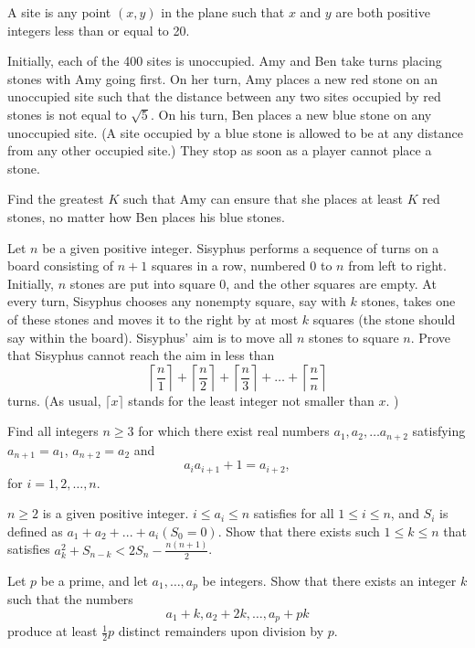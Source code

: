\documentclass[11pt]{scrartcl}
\begin{document}
\begin{problem}[6246999615324043054]
	A site is any point $(x, y)$ in the plane such that $x$ and $y$ are both positive integers less than or equal to 20.

Initially, each of the 400 sites is unoccupied. Amy and Ben take turns placing stones with Amy going first. On her turn, Amy places a new red stone on an unoccupied site such that the distance between any two sites occupied by red stones is not equal to $\sqrt{5}$. On his turn, Ben places a new blue stone on any unoccupied site. (A site occupied by a blue stone is allowed to be at any distance from any other occupied site.) They stop as soon as a player cannot place a stone.

Find the greatest $K$ such that Amy can ensure that she places at least $K$ red stones, no matter how Ben places his blue stones.
\end{problem}
\begin{problem}[8670333331361701457]
	Let $n$ be a given positive integer. Sisyphus performs a sequence of turns on a board consisting of $n + 1$ squares in a row, numbered $0$ to $n$ from left to right. Initially, $n$ stones are put into square $0$, and the other squares are empty. At every turn, Sisyphus chooses any nonempty square, say with $k$ stones, takes one of these stones and moves it to the right by at most $k$ squares (the stone should say within the board). Sisyphus' aim is to move all $n$ stones to square $n$.
Prove that Sisyphus cannot reach the aim in less than
\[ \left \lceil \frac{n}{1} \right \rceil + \left \lceil \frac{n}{2} \right \rceil + \left \lceil \frac{n}{3} \right \rceil + \dots + \left \lceil \frac{n}{n} \right \rceil \]turns. (As usual, $\lceil x \rceil$ stands for the least integer not smaller than $x$. )
\end{problem}
\begin{problem}[574223786384294]
Find all integers $n \geq 3$ for which there exist real numbers $a_1, a_2, \dots a_{n + 2}$ satisfying $a_{n + 1} = a_1$, $a_{n + 2} = a_2$ and
$$a_ia_{i + 1} + 1 = a_{i + 2},$$for $i = 1, 2, \dots, n$.
\end{problem}
\begin{problem}[655207782865052]
$n\ge2$ is a given positive integer. $i\leq a_i \leq n$ satisfies for all $1\leq i\leq n$, and $S_i$ is defined as $a_1+a_2+...+a_i(S_0=0)$. Show that there exists such $1\leq k\leq n$ that satisfies $a_k^2+S_{n-k}<2S_n-\frac{n(n+1)}{2}$.
\end{problem}
\begin{problem}[4278278843148290847]
	Let $p$ be a prime, and let $a_1, \dots, a_p$ be integers. Show that there exists an integer $k$ such that the numbers
\[a_1 + k, a_2 + 2k, \dots, a_p + pk\]produce at least $\tfrac{1}{2} p$ distinct remainders upon division by $p$.
\end{problem}
\end{document}
